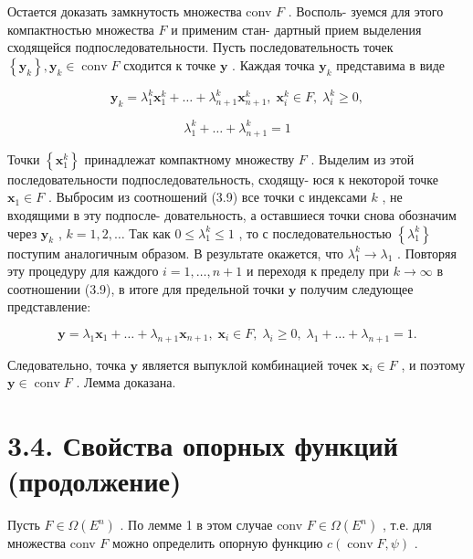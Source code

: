 \documentclass[8pt]{extarticle}
\begin{document}
Остается доказать замкнутость множества conv \(F\) . Восполь- зуемся для этого компактностью множества \(F\) и применим стан- дартный прием выделения сходящейся подпоследовательности. Пусть последовательность точек \(\left\{  {\mathbf{y}}_{k}\right\}  ,{\mathbf{y}}_{k} \in  \operatorname{conv}F\) сходится к точке \(\mathbf{y}\) . Каждая точка \({\mathbf{y}}_{k}\) представима в виде

\[
{\mathbf{y}}_{k} = {\lambda }_{1}^{k}{\mathbf{x}}_{1}^{k} + \ldots  + {\lambda }_{n + 1}^{k}{\mathbf{x}}_{n + 1}^{k},\;{\mathbf{x}}_{i}^{k} \in  F,\;{\lambda }_{i}^{k} \geq  0,
\]

\[
{\lambda }_{1}^{k} + \ldots  + {\lambda }_{n + 1}^{k} = 1 \tag{3.9}
\]

Точки \(\left\{  {\mathbf{x}}_{1}^{k}\right\}\) принадлежат компактному множеству \(F\) . Выделим из этой последовательности подпоследовательность, сходящу- юся к некоторой точке \({\mathbf{x}}_{1} \in  F\) . Выбросим из соотношений (3.9) все точки с индексами \(k\) , не входящими в эту подпосле- довательность, а оставшиеся точки снова обозначим через \({\mathbf{y}}_{k}\) , \(k = 1,2,\ldots\) Так как \(0 \leq  {\lambda }_{1}^{k} \leq  1\) , то с последовательностью \(\left\{  {\lambda }_{1}^{k}\right\}\) поступим аналогичным образом. В результате окажется, что \({\lambda }_{1}^{k} \rightarrow  {\lambda }_{1}\) . Повторяя эту процедуру для каждого \(i = 1,\ldots ,n + 1\) и переходя к пределу при \(k \rightarrow  \infty\) в соотношении (3.9), в итоге для предельной точки \(\mathbf{y}\) получим следующее представление:

\[
\mathbf{y} = {\lambda }_{1}{\mathbf{x}}_{1} + \ldots  + {\lambda }_{n + 1}{\mathbf{x}}_{n + 1},\;{\mathbf{x}}_{i} \in  F,\;{\lambda }_{i} \geq  0,\;{\lambda }_{1} + \ldots  + {\lambda }_{n + 1} = 1.
\]

Следовательно, точка \(\mathbf{y}\) является выпуклой комбинацией точек \({\mathbf{x}}_{i} \in  F\) , и поэтому \(\mathbf{y} \in  \operatorname{conv}F\) . Лемма доказана.

\section*{3.4. Свойства опорных функций (продолжение)}

Пусть \(F \in  \Omega \left( {E}^{n}\right)\) . По лемме 1 в этом случае conv \(F \in  \Omega \left( {E}^{n}\right)\) , т.е. для множества conv \(F\) можно определить опорную функцию \(c\left( {\operatorname{conv}F,\psi }\right)\) .
\end{document}
